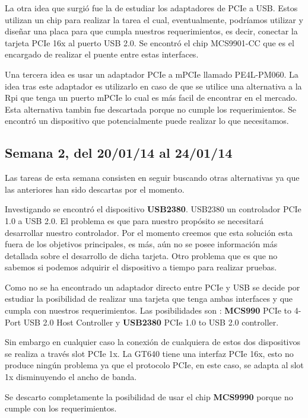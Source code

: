 \documentclass[11pt,oneside,titlepage]{article}
\begin{document}
La otra idea que surgió fue la de estudiar los adaptadores de PCIe a USB. Estos
utilizan un chip para realizar la tarea el cual, eventualmente, podríamos
utilizar y diseñar una placa para que cumpla nuestros requerimientos, es decir,
conectar la tarjeta PCIe 16x al puerto USB 2.0. Se encontró el chip MCS9901-CC
que es el encargado de realizar el puente entre estas interfaces.  

Una tercera idea es usar un adaptador PCIe a mPCIe llamado PE4L-PM060.  La idea
tras este adaptador es utilizarlo en caso de que se utilice una alternativa a
la Rpi que tenga un puerto mPCIe lo cual es más facil de encontrar en el
mercado.  Esta alternativa tambin fue descartada porque no cumple los
requerimientos. Se encontró un dispositivo que potencialmente puede realizar lo
que necesitamos. 

\subsection*{Semana 2, del 20/01/14 al 24/01/14}

Las tareas de esta semana consisten en seguir buscando otras alternativas ya que las
anteriores han sido descartas por el momento.

Investigando se encontró el dispositivo \textbf{USB2380}. USB2380 un controlador
PCIe 1.0 a USB 2.0. El problema es que para nuestro propósito se necesitará
desarrollar nuestro controlador. Por el momento creemos que esta solución esta
fuera de los objetivos principales, es más, aún no se posee información más
detallada sobre el desarrollo de dicha tarjeta. Otro problema que es que no
sabemos si podemos adquirir el dispositivo a tiempo para realizar pruebas.

Como no se ha encontrado un adaptador directo entre PCIe y USB se decide por
estudiar la posibilidad de realizar una tarjeta que tenga ambas interfaces y que
cumpla con nuestros requerimientos. Las posibilidades son : \textbf{MCS990} PCIe
to 4-Port USB 2.0 Host Controller y \textbf{USB2380} PCIe 1.0 to USB 2.0
controller.

Sin embargo en cualquier caso la conexión de cualquiera de estos dos dispositivos
se realiza a través slot PCIe 1x. La GT640 tiene una interfaz PCIe 16x, esto no
produce ningún problema ya que el protocolo PCIe, en este caso, se adapta al slot
1x disminuyendo el ancho de banda.

Se descarto completamente la posibilidad de usar el chip \textbf{MCS9990} porque
no cumple con los requerimientos.
\end{document}
